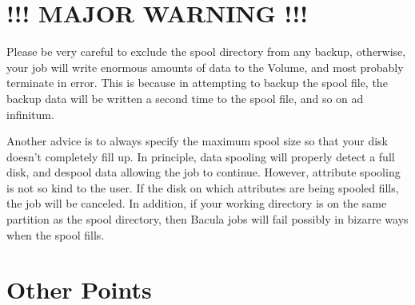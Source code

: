 \label{warning}

\section{!!! MAJOR WARNING !!!}

Please be very careful to exclude the spool directory from any backup,
otherwise, your job will write enormous amounts of data to the Volume, and
most probably terminate in error. This is because in attempting to backup the
spool file, the backup data will be written a second time to the spool file,
and so on ad infinitum. 

Another advice is to always specify the maximum spool size so that your disk
doesn't completely fill up. In principle, data spooling will properly detect a
full disk, and despool data allowing the job to continue. However, attribute
spooling is not so kind to the user. If the disk on which attributes are being
spooled fills, the job will be canceled. In addition, if your working 
directory is on the same partition as the spool directory, then Bacula jobs
will fail possibly in bizarre ways when the spool fills.

\label{points}
\section{Other Points}

